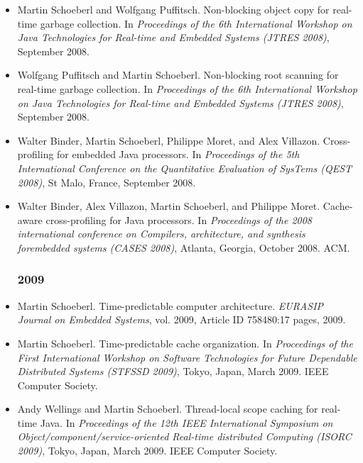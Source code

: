 \begin{itemize}
\item Martin Schoeberl and Wolfgang Puffitsch. Non-blocking
    object copy for real-time garbage collection. In {\em
    Proceedings of the 6th International Workshop on Java
  Technologies for Real-time and Embedded Systems (JTRES 2008)},
  September 2008.

\item Wolfgang Puffitsch and Martin Schoeberl. Non-blocking root
    scanning for real-time garbage collection. In {\em
    Proceedings of the 6th International Workshop on Java
  Technologies for Real-time and Embedded Systems (JTRES 2008)},
  September 2008.

\item Walter Binder, Martin Schoeberl, Philippe Moret, and Alex
    Villazon. Cross-profiling for embedded Java processors. In
    {\em Proceedings of the 5th International Conference on the
    Quantitative Evaluation of SysTems (QEST 2008)}, St Malo,
  France, September 2008.

\item Walter Binder, Alex Villazon, Martin Schoeberl, and
    Philippe Moret. Cache-aware cross-profiling for Java
    processors. In {\em Proceedings of the 2008 international
    conference on Compilers, architecture, and synthesis
    forembedded systems (CASES 2008)}, Atlanta, Georgia, October
    2008. ACM.

\subsubsection*{2009}

\item Martin Schoeberl. Time-predictable computer architecture.
    {\em EURASIP Journal on Embedded Systems}, vol. 2009, Article
    ID 758480:17 pages, 2009.

\item Martin Schoeberl. Time-predictable cache organization. In
    {\em Proceedings of the First International Workshop on
    Software Technologies for Future Dependable Distributed
    Systems (STFSSD 2009)}, Tokyo, Japan, March
  2009. IEEE Computer Society.

\item Andy Wellings and Martin Schoeberl. Thread-local scope
    caching for real-time {J}ava. In {\em Proceedings of the 12th
    IEEE International Symposium on
  Object/component/service-oriented Real-time distributed
  Computing (ISORC 2009)}, Tokyo, Japan, March 2009. IEEE
  Computer Society.


\end{itemize}
